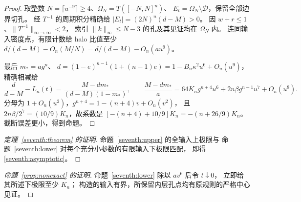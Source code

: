 \begin{proof}
取整数 \(N=\lceil u^{-9}\rceil\ge4\)、\(\Omega_N=T([-N,N]^n)\)、
\(E_t=\Omega_N\setminus\mathscr D\)，保留全部边界切孔。
经 \(T^{-1}\) 的周期积分精确给 \(|E_t|=(2N)^n(d-M)>0\)。
因 \(w+r\le1\)、\(\|T^{-1}\|_{\infty\to\infty}<2\)，
索引 \(\|k\|_\infty\le N-3\) 的孔及其见证均在 \(\Omega_N\) 内。
连同输入密度点，有限计数给 halo 比值至少
\(d/(d-M)-O_n(M/N)=d/(d-M)-O_n(au^9)\)。

最后 \(m_*=ag^n\)、
\(d=(1-e)^{n-1}(1+(n-1)e)=1-B_n\kappa^2u^6+O_n(u^9)\)，精确相减给
\[
 \frac d{d-M}-L_n(t)=\frac{M-dm_*}{(d-M)(1-m_*)},\qquad
 \frac{M-dm_*}{a}=64K_ng^{n+4}u^6+2n\beta g^{n-1}u^7+O_n(u^8).
\]
分母为 \(1+O_n(u^2)\)，\(g^{n+4}=1-(n+4)v+O_n(v^2)\)，
且 \(2n\beta/2^7=(10/9)K_n\)，故系数是
\([-(n+4)+10/9]K_n=-(n+26/9)K_n\)。
截断误差更小，得到命题。
\end{proof}

\begin{proof}[定理~\ref{seventh:theorem} 的证明]
命题~\ref{seventh:upper} 的全输入上极限与
命题~\ref{seventh:lower} 对每个充分小参数的有限输入下极限匹配，
即得 \eqref{seventh:asymptotic}。
\end{proof}

\begin{proof}[命题~\ref{prop:nonexact} 的证明]
命题~\ref{seventh:lower} 除以 \(av^6\) 后令 \(t\downarrow0\)，
立即给其所述下极限至少 \(K_n\)；
构造的输入有界，所保留内层孔点均有原规则的严格中心见证。
\end{proof}

